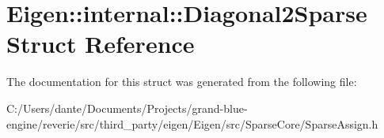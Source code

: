 \hypertarget{struct_eigen_1_1internal_1_1_diagonal2_sparse}{}\section{Eigen\+::internal\+::Diagonal2\+Sparse Struct Reference}
\label{struct_eigen_1_1internal_1_1_diagonal2_sparse}


The documentation for this struct was generated from the following file\+:\begin{DoxyCompactItemize}
\item 
C\+:/\+Users/dante/\+Documents/\+Projects/grand-\/blue-\/engine/reverie/src/third\+\_\+party/eigen/\+Eigen/src/\+Sparse\+Core/Sparse\+Assign.\+h\end{DoxyCompactItemize}
